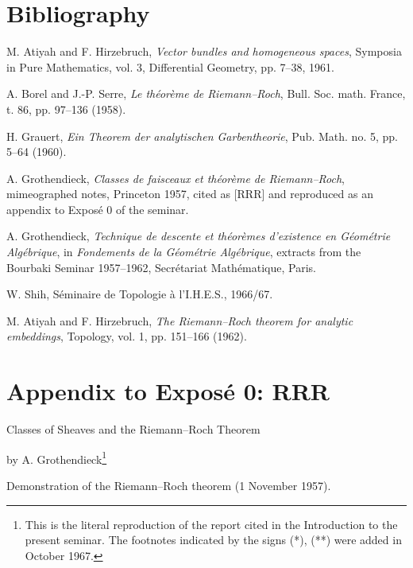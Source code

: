 \documentclass[11pt]{article}
\begin{document}
\section*{Bibliography}
\begin{enumerate}[label={[\arabic*]},leftmargin=2.5em]
\item M. Atiyah and F. Hirzebruch, \emph{Vector bundles and homogeneous spaces}, Symposia in Pure Mathematics, vol. 3, Differential Geometry, pp. 7--38, 1961.
\item A. Borel and J.-P. Serre, \emph{Le th\'eor\`eme de Riemann--Roch}, Bull. Soc. math. France, t. 86, pp. 97--136 (1958).
\item H. Grauert, \emph{Ein Theorem der analytischen Garbentheorie}, Pub. Math. no. 5, pp. 5--64 (1960).
\item A. Grothendieck, \emph{Classes de faisceaux et th\'eor\`eme de Riemann--Roch}, mimeographed notes, Princeton 1957, cited as [RRR] and reproduced as an appendix to Expos\'e 0 of the seminar.
\item A. Grothendieck, \emph{Technique de descente et th\'eor\`emes d'existence en G\'eom\'etrie Alg\'ebrique}, in \emph{Fondements de la G\'eom\'etrie Alg\'ebrique}, extracts from the Bourbaki Seminar 1957--1962, Secr\'etariat Math\'ematique, Paris.
\item W. Shih, S\'eminaire de Topologie \`a l'I.H.E.S., 1966/67.
\item M. Atiyah and F. Hirzebruch, \emph{The Riemann--Roch theorem for analytic embeddings}, Topology, vol. 1, pp. 151--166 (1962).
\end{enumerate}



\clearpage



\section*{Appendix to Exposé 0: RRR}
\begin{center}
{\Large Classes of Sheaves and the Riemann--Roch Theorem}\par
\vspace{0.5em}
by A. Grothendieck\footnote{This is the literal reproduction of the report cited in the Introduction to the present seminar. The footnotes indicated by the signs (*), (**) were added in October 1967.}
\end{center}

\begin{center}
Demonstration of the Riemann--Roch theorem (1 November 1957).
\end{center}
\end{document}
